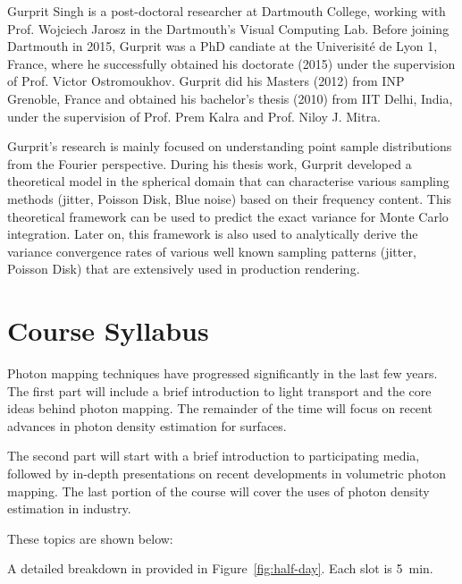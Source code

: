 \documentclass[11pt,fleqn]{book} %
\begin{document}
Gurprit Singh is a post-doctoral researcher at Dartmouth College, working with Prof. Wojciech Jarosz in the Dartmouth's Visual Computing Lab. Before joining Dartmouth in 2015, Gurprit was a PhD candiate 
at the Univerisit\'{e} de Lyon 1, France, where he successfully obtained his doctorate (2015) under the 
supervision of Prof. Victor Ostromoukhov. Gurprit did his Masters (2012) from INP Grenoble, France and 
obtained his bachelor's thesis (2010) from IIT Delhi, India, under the supervision of Prof. Prem Kalra and Prof. Niloy J. Mitra.

Gurprit's research is mainly focused on understanding point sample distributions from the Fourier perspective. During his thesis work, Gurprit developed a theoretical model in the spherical domain that can characterise various sampling methods (jitter, Poisson Disk, Blue noise) based on their frequency content. This theoretical framework can be used to predict the exact variance for Monte Carlo integration. Later on, this framework is also used to analytically derive the variance convergence rates 
of various well known sampling patterns (jitter, Poisson Disk) that are extensively used in production rendering.
\cleardoublepage




{}
\chapter*{Course Syllabus}
Photon mapping techniques have progressed significantly in the last few years. The first part will include a brief introduction to light transport and the core ideas behind photon mapping. The remainder of the time will focus on recent advances in photon density estimation for surfaces.

The second part will start with a brief introduction to participating media, followed by in-depth presentations on recent developments in volumetric photon mapping. The last portion of the course will cover the uses of photon density estimation in industry.

These topics are shown below:

A detailed breakdown in provided in Figure~\ref{fig:half-day}. Each slot is 5~min.
\end{document}
